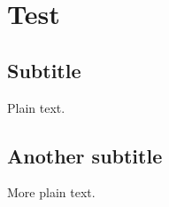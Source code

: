 \documentclass{article}
\begin{document}
\section{Test}

\subsection{Subtitle}

Plain text.

\subsection{Another subtitle}

More plain text.
\end{document}
